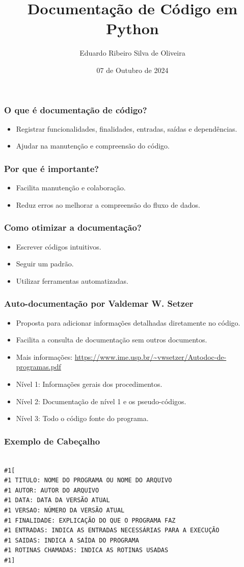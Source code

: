 \documentclass{beamer}
\title{Documentação de Código em Python}
\author{Eduardo Ribeiro Silva de Oliveira}
\date{07 de Outubro de 2024}
\begin{document}
\frame{\titlepage}

\begin{frame}
  \frametitle{O que é documentação de código?}
  \begin{itemize}
    \item Registrar funcionalidades, finalidades, entradas, saídas e dependências.
    \item Ajudar na manutenção e compreensão do código.
  \end{itemize}
\end{frame}

\begin{frame}
  \frametitle{Por que é importante?}
  \begin{itemize}
    \item Facilita manutenção e colaboração.
    \item Reduz erros ao melhorar a compreensão do fluxo de dados.
  \end{itemize}
\end{frame}

\begin{frame}
  \frametitle{Como otimizar a documentação?}
  \begin{itemize}
    \item Escrever códigos intuitivos.
    \item Seguir um padrão.
    \item Utilizar ferramentas automatizadas.
  \end{itemize}
\end{frame}

\begin{frame}
  \frametitle{Auto-documentação por Valdemar W. Setzer}
  \begin{itemize}
    \item Proposta para adicionar informações detalhadas diretamente no código.
    \item Facilita a consulta de documentação sem outros documentos.
    \item Mais informações: \url{https://www.ime.usp.br/~vwsetzer/Autodoc-de-programas.pdf}
    \item Nível 1: Informações gerais dos procedimentos.
    \item Nível 2: Documentação de nível 1 e os pseudo-códigos.
    \item Nível 3: Todo o código fonte do programa.
  \end{itemize}
\end{frame}

\begin{frame}[fragile]
  \frametitle{Exemplo de Cabeçalho}
  \tiny
  \begin{verbatim}

#1[
#1 TITULO: NOME DO PROGRAMA OU NOME DO ARQUIVO
#1 AUTOR: AUTOR DO ARQUIVO
#1 DATA: DATA DA VERSÃO ATUAL
#1 VERSAO: NÚMERO DA VERSÃO ATUAL
#1 FINALIDADE: EXPLICAÇÃO DO QUE O PROGRAMA FAZ
#1 ENTRADAS: INDICA AS ENTRADAS NECESSÁRIAS PARA A EXECUÇÃO
#1 SAIDAS: INDICA A SAÍDA DO PROGRAMA
#1 ROTINAS CHAMADAS: INDICA AS ROTINAS USADAS
#1]

  \end{verbatim}
  \normalsize
\end{frame}
\end{document}
